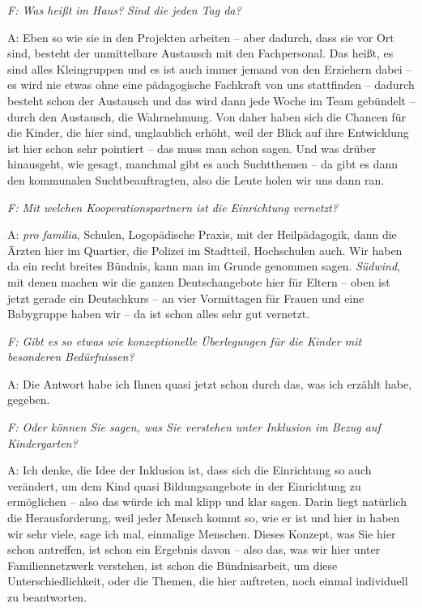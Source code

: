 \begin{linenumbers}
\emph{F: Was heißt im Haus? Sind die jeden Tag da?}

A: Eben so wie sie in den Projekten arbeiten -- aber dadurch, dass sie vor Ort sind, besteht der unmittelbare Austausch mit den Fachpersonal. Das heißt, es sind alles Kleingruppen und es ist auch immer jemand von den Erziehern dabei -- es wird nie etwas ohne eine pädagogische Fachkraft von uns stattfinden -- dadurch besteht schon der Austausch und das wird dann jede Woche im Team gebündelt -- durch den Austausch, die Wahrnehmung. Von daher haben sich die Chancen für die Kinder, die hier sind, unglaublich erhöht, weil der Blick auf ihre Entwicklung ist hier schon sehr pointiert -- das muss man schon sagen. Und was drüber hinausgeht, wie gesagt, manchmal gibt es auch Suchtthemen -- da gibt es dann den kommunalen Suchtbeauftragten, also die Leute holen wir uns dann ran. 

\emph{F: Mit welchen Kooperationspartnern ist die Einrichtung vernetzt?}

A: \emph{pro familia}, Schulen, Logopädische Praxis, mit der Heilpädagogik, dann die Ärzten hier im Quartier, die Polizei im Stadtteil, Hochschulen auch. Wir haben da ein recht breites Bündnis, kann man im Grunde genommen sagen. \emph{Südwind}, mit denen machen wir die ganzen Deutschangebote hier für Eltern -- oben ist jetzt gerade ein Deutschkurs -- an vier Vormittagen für Frauen und eine Babygruppe haben wir -- da ist schon alles sehr gut vernetzt. 

\emph{F: Gibt es so etwas wie konzeptionelle Überlegungen für die Kinder mit besonderen Bedürfnissen?}

A: Die Antwort habe ich Ihnen quasi jetzt schon durch das, was ich erzählt habe, gegeben.

\emph{F: Oder können Sie sagen, was Sie verstehen unter Inklusion im Bezug auf Kindergarten?}

A: Ich denke, die Idee der Inklusion ist, dass sich die Einrichtung so auch verändert, um dem Kind quasi Bildungsangebote in der Einrichtung zu ermöglichen -- also das würde ich mal klipp und klar sagen. Darin liegt natürlich die Herausforderung, weil jeder Mensch kommt so, wie er ist und hier in haben wir sehr viele, sage ich mal, einmalige Menschen. Dieses Konzept, was Sie hier schon antreffen, ist schon ein Ergebnis davon -- also das, was wir hier unter Familiennetzwerk verstehen, ist schon die Bündnisarbeit, um diese Unterschiedlichkeit, oder die Themen, die hier auftreten, noch einmal individuell zu beantworten. 


\end{linenumbers}
